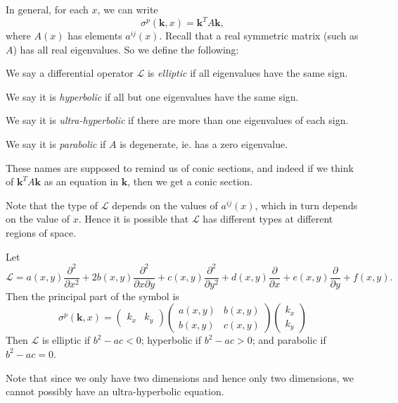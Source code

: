 \documentclass[a4paper]{article}
\begin{document}
In general, for each $x$, we can write
\[
  \sigma^p (\mathbf{k}, x) = \mathbf{k}^T A\mathbf{k},
\]
where $A(x)$ has elements $a^{ij}(x)$. Recall that a real symmetric matrix (such as $A$) has all real eigenvalues. So we define the following:

\begin{defi}
  We say a differential operator $\mathcal{L}$ is \emph{elliptic} if all eigenvalues have the same sign.

  We say it is \emph{hyperbolic} if all but one eigenvalues have the same sign.

  We say it is \emph{ultra-hyperbolic} if there are more than one eigenvalues of each sign.

  We say it is \emph{parabolic} if $A$ is degenerate, ie. has a zero eigenvalue.
\end{defi}
These names are supposed to remind us of conic sections, and indeed if we think of $\mathbf{k}^T A\mathbf{k}$ as an equation in $\mathbf{k}$, then we get a conic section.

Note that the type of $\mathcal{L}$ depends on the values of $a^{ij}(x)$, which in turn depends on the value of $x$. Hence it is possible that $\mathcal{L}$ has different types at different regions of space.

\begin{eg}
  Let
  \[
    \mathcal{L} = a(x, y) \frac{\partial^2}{\partial x^2} + 2b(x, y) \frac{\partial^2}{\partial x \partial y} + c(x, y) \frac{\partial^2}{\partial y^2} + d(x, y) \frac{\partial}{\partial x} + e(x, y) \frac{\partial}{\partial y} + f(x, y).
  \]
  Then the principal part of the symbol is
  \[
    \sigma^p(\mathbf{k}, x) =
    \begin{pmatrix}
      k_x & k_y
    \end{pmatrix}
    \begin{pmatrix}
      a(x, y) & b(x, y)\\
      b(x, y) & c(x, y)
    \end{pmatrix}
    \begin{pmatrix}
      k_x \\ k_y
    \end{pmatrix}
  \]
  Then $\mathcal{L}$ is elliptic if $b^2 - ac < 0$; hyperbolic if $b^2 - ac > 0$; and parabolic if $b^2 - ac = 0$.

  Note that since we only have two dimensions and hence only two dimensions, we cannot possibly have an ultra-hyperbolic equation.
\end{eg}
\end{document}

